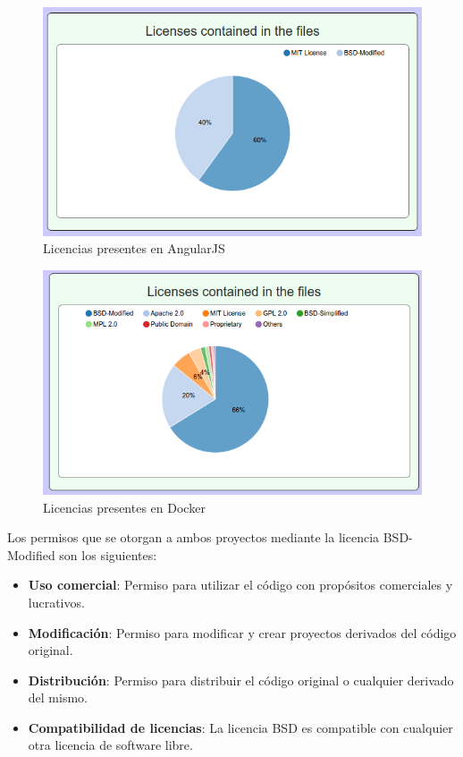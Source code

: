 \documentclass[a4paper, spanish, 12pt]{book}
\begin{document}
\begin{figure}
  \centering
  \includegraphics[width=12cm, keepaspectratio]{img/licenses_angular}
  \caption{Licencias presentes en AngularJS}
  \label{fig:angular_license}
\end{figure}

\begin{figure}
  \centering
  \includegraphics[width=14cm, keepaspectratio]{img/licenses_docker}
  \caption{Licencias presentes en Docker}
  \label{fig:docker_license}
\end{figure}

Los permisos que se otorgan a ambos proyectos mediante la licencia BSD-Modified son los siguientes:

\begin{itemize}
	\item \textbf{Uso comercial}: Permiso para utilizar el c\'odigo con prop\'ositos comerciales y lucrativos.

	\item \textbf{Modificaci\'on}: Permiso para modificar y crear proyectos derivados del c\'odigo original.

	\item \textbf{Distribuci\'on}: Permiso para distribuir el c\'odigo original o cualquier derivado del mismo.

	\item \textbf{Compatibilidad de licencias}: La licencia BSD es compatible con cualquier otra licencia de software libre.
\end{itemize}
\end{document}
